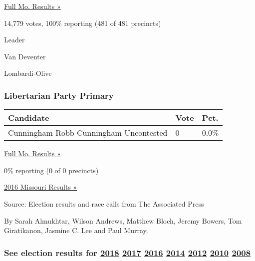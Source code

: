 \href{https://www.nytimes3xbfgragh.onion/elections/results/missouri}{Full
Mo. Results »}

14,779 votes, 100\% reporting (481 of 481 precincts)

Leader

 Van Deventer

 Lombardi-Olive

\hypertarget{libertarian-party-primary}{%
\subsubsection{Libertarian Party
Primary}\label{libertarian-party-primary}}

\begin{longtable}[]{@{}lll@{}}
\toprule
Candidate & Vote & Pct.\tabularnewline
\midrule
\endhead
 Cunningham Robb Cunningham Uncontested & 0 & 0.0\%\tabularnewline
\bottomrule
\end{longtable}

\href{https://www.nytimes3xbfgragh.onion/elections/results/missouri}{Full
Mo. Results »}

0\% reporting (0 of 0 precincts)

\href{https://www.nytimes3xbfgragh.onion/elections/results/missouri}{2016
Missouri Results »}

Source: Election results and race calls from The Associated Press

By Sarah Almukhtar, Wilson Andrews, Matthew Bloch, Jeremy Bowers, Tom
Giratikanon, Jasmine C. Lee and Paul Murray.

\hypertarget{see-election-results-for-2018-2017-2016-2014-2012-2010-2008}{%
\subsubsection{\texorpdfstring{See election results for
\href{https://www.nytimes3xbfgragh.onion/interactive/2018/us/elections/calendar-primary-results.html}{2018}
\href{https://www.nytimes3xbfgragh.onion/interactive/2017/us/elections/election-calendar.html}{2017}
\href{https://www.nytimes3xbfgragh.onion/elections/results/president}{2016}
\href{https://www.nytimes3xbfgragh.onion/elections/2014/results/senate}{2014}
\href{https://www.nytimes3xbfgragh.onion/elections/2012/results/president.html}{2012}
\href{https://www.nytimes3xbfgragh.onion/elections/2010/results/senate.html}{2010}
\href{https://www.nytimes3xbfgragh.onion/elections/2008/results/president/map.html}{2008}}{See election results for 2018 2017 2016 2014 2012 2010 2008}}\label{see-election-results-for-2018-2017-2016-2014-2012-2010-2008}}

